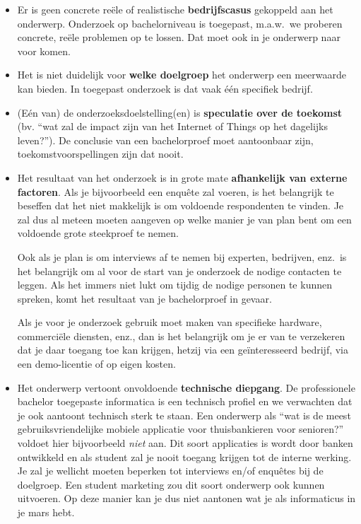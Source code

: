 \begin{itemize}
  \item Er is geen concrete reële of realistische \textbf{bedrijfscasus} gekoppeld aan het onderwerp. Onderzoek op bachelorniveau is toegepast, m.a.w.~we proberen concrete, reële problemen op te lossen. Dat moet ook in je onderwerp naar voor komen.

  \item Het is niet duidelijk voor \textbf{welke doelgroep} het onderwerp een meerwaarde kan bieden. In toegepast onderzoek is dat vaak één specifiek bedrijf.
  \item (Eén van) de onderzoeksdoelstelling(en) is \textbf{speculatie over de toekomst} (bv. ``wat zal de impact zijn van het Internet of Things op het dagelijks leven?''). De conclusie van een bachelorproef moet aantoonbaar zijn, toekomstvoorspellingen zijn dat nooit.

  \item Het resultaat van het onderzoek is in grote mate \textbf{afhankelijk van externe factoren}. Als je bijvoorbeeld een enquête zal voeren, is het belangrijk te beseffen dat het niet makkelijk is om voldoende respondenten te vinden. Je zal dus al meteen moeten aangeven op welke manier je van plan bent om een voldoende grote steekproef te nemen.
  
  Ook als je plan is om interviews af te nemen bij experten, bedrijven, enz.\ is het belangrijk om al voor de start van je onderzoek de nodige contacten te leggen. Als het immers niet lukt om tijdig de nodige personen te kunnen spreken, komt het resultaat van je bachelorproef in gevaar.

  Als je voor je onderzoek gebruik moet maken van specifieke hardware, commerciële diensten, enz., dan is het belangrijk om je er van te verzekeren dat je daar toegang toe kan krijgen, hetzij via een geïnteresseerd bedrijf, via een demo-licentie of op eigen kosten.

  \item Het onderwerp vertoont onvoldoende \textbf{technische diepgang}. De professionele bachelor toegepaste informatica is een technisch profiel en we verwachten dat je ook aantoont technisch sterk te staan. Een onderwerp als ``wat is de meest gebruiksvriendelijke mobiele applicatie voor thuisbankieren voor senioren?'' voldoet hier bijvoorbeeld \textit{niet} aan. Dit soort applicaties is wordt door banken ontwikkeld en als student zal je nooit toegang krijgen tot de interne werking. Je zal je wellicht moeten beperken tot interviews en/of enquêtes bij de doelgroep. Een student marketing zou dit soort onderwerp ook kunnen uitvoeren. Op deze manier kan je dus niet aantonen wat je als informaticus in je mars hebt.


\end{itemize}
